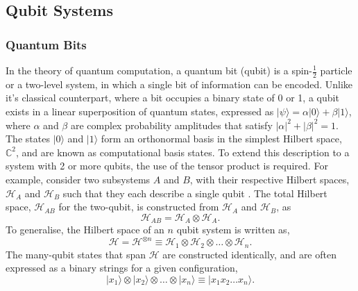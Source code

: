 

\subsection{Qubit Systems}
\subsubsection{Quantum Bits} %

In the theory of quantum computation, a quantum bit (qubit) is a spin-$\frac{1}{2}$ particle or a two-level system, in which a single bit of information can be encoded. 
Unlike it's classical counterpart, where a bit occupies a binary state of 0 or 1, a qubit exists in a linear superposition of quantum states, expressed as 
$|\psi\rangle = \alpha |0\rangle + \beta |1\rangle$, where $\alpha$ and $\beta$ are complex probability amplitudes that satisfy $|\alpha|^2 + |\beta|^2 = 1$.
The states $|0\rangle$ and $|1\rangle$ form an orthonormal basis in the simplest Hilbert space, $\mathbb{C}^2$, and are known as computational basis states. 
To extend this description to a system with 2 or more qubits, the use of the tensor product is required. For example, consider two subsystems
$A$ and $B$, with their respective Hilbert spaces, $\mathcal{H}_{A}$ and $\mathcal{H}_{B}$ such that they each describe a single qubit \cite{schumacher_westmoreland_2010}. 
The total Hilbert space, $\mathcal{H}_{AB}$ for the two-qubit, is constructed from $\mathcal{H}_{A}$ and $\mathcal{H}_{B}$, as
\begin{equation}
    \mathcal{H}_{AB} = \mathcal{H}_{A} \otimes \mathcal{H}_{A}.
\end{equation}
To generalise, the Hilbert space of an $n$ qubit system is written as, 
\begin{equation}\label{Hilbert Space}
    \mathcal{H} = \mathcal{H}^{\otimes n} \equiv \mathcal{H}_{1} \otimes \mathcal{H}_{2} \otimes \dots \otimes \mathcal{H}_{n}. 
\end{equation}
The many-qubit states that span $\mathcal{H}$ are constructed identically, and are often expressed as a binary strings for a given configuration, 
\begin{equation}\label{nqubit}
    |x_1\rangle \otimes |x_2\rangle \otimes \dots \otimes |x_n\rangle \equiv |x_1 x_2 \dots x_n\rangle.
\end{equation}





